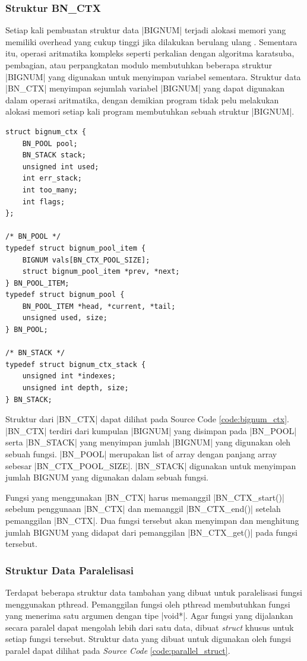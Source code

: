    \subsubsection{Struktur BN\_CTX}

    Setiap kali pembuatan struktur data |BIGNUM| terjadi alokasi memori yang memiliki overhead yang cukup tinggi jika dilakukan berulang ulang \citep{doc_bnctx}. Sementara itu, operasi aritmatika kompleks seperti perkalian dengan algoritma karatsuba, pembagian, atau perpangkatan modulo membutuhkan beberapa struktur |BIGNUM| yang digunakan untuk menyimpan variabel sementara. Struktur data |BN_CTX| menyimpan sejumlah variabel |BIGNUM| yang dapat digunakan dalam operasi aritmatika, dengan demikian program tidak pelu melakukan alokasi memori setiap kali program membutuhkan sebuah struktur |BIGNUM|.


    \begin{lstlisting}[caption={Struktur bignum\_ctx}, label={code:bignum_ctx}]
struct bignum_ctx {
    BN_POOL pool;
    BN_STACK stack;
    unsigned int used;
    int err_stack;
    int too_many;
    int flags;
};

/* BN_POOL */
typedef struct bignum_pool_item {
    BIGNUM vals[BN_CTX_POOL_SIZE];
    struct bignum_pool_item *prev, *next;
} BN_POOL_ITEM;
typedef struct bignum_pool {
    BN_POOL_ITEM *head, *current, *tail;
    unsigned used, size;
} BN_POOL;

/* BN_STACK */
typedef struct bignum_ctx_stack {
    unsigned int *indexes;
    unsigned int depth, size;
} BN_STACK;
    \end{lstlisting}

    Struktur dari |BN_CTX| dapat dilihat pada Source Code \ref{code:bignum_ctx}. |BN_CTX| terdiri dari kumpulan |BIGNUM| yang disimpan pada |BN_POOL| serta |BN_STACK| yang menyimpan jumlah |BIGNUM| yang digunakan oleh sebuah fungsi. |BN_POOL| merupakan list of array dengan panjang array sebesar |BN_CTX_POOL_SIZE|. |BN_STACK| digunakan untuk menyimpan jumlah BIGNUM yang digunakan dalam sebuah fungsi.

    Fungsi yang menggunakan |BN_CTX| harus memanggil |BN_CTX_start()| sebelum penggunaan |BN_CTX| dan memanggil |BN_CTX_end()| setelah pemanggilan |BN_CTX|. Dua fungsi tersebut akan menyimpan dan menghitung jumlah BIGNUM yang didapat dari pemanggilan |BN_CTX_get()| pada fungsi tersebut.

    \subsubsection{Struktur Data Paralelisasi}
    Terdapat beberapa struktur data tambahan yang dibuat untuk paralelisasi fungsi menggunakan pthread. Pemanggilan fungsi oleh pthread membutuhkan fungsi yang menerima satu argumen dengan tipe |void*|. Agar fungsi yang dijalankan secara paralel dapat mengolah lebih dari satu data, dibuat \textit{struct} khusus untuk setiap fungsi tersebut. Struktur data yang dibuat untuk digunakan oleh fungsi paralel dapat dilihat pada \textit{Source Code} \ref{code:parallel_struct}.

